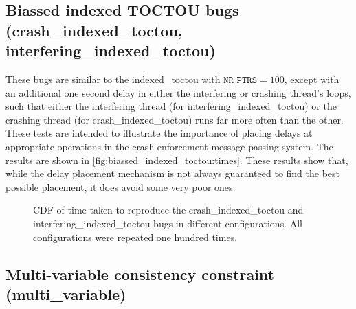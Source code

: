 \subsection{Biassed indexed TOCTOU bugs (crash\_indexed\_toctou, interfering\_indexed\_toctou)}

These bugs are similar to the indexed\_toctou with $\texttt{NR\_PTRS}
= 100$, except with an additional one second delay in either the
interfering or crashing thread's loops, such that either the
interfering thread (for interfering\_indexed\_toctou) or the crashing
thread (for crash\_indexed\_toctou) runs far more often than the
other.  These tests are intended to illustrate the importance of
placing delays at appropriate operations in the crash enforcement
message-passing system.  The results are shown in
\autoref{fig:biassed_indexed_toctou:times}.  These results show
that, while the delay placement mechanism is not always guaranteed to
find the best possible placement, it does avoid some very poor ones.

\begin{figure}
  
  \caption{CDF of time taken to reproduce the crash\_indexed\_toctou
    and interfering\_indexed\_toctou bugs in different configurations.
    All configurations were repeated one hundred times.}
  \label{fig:biassed_indexed_toctou:times}
\end{figure}

\subsection{Multi-variable consistency constraint (multi\_variable)}

